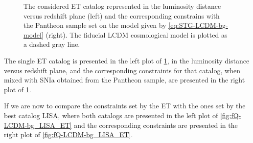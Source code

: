 \begin{figure}[h!]
\begin{subfigure}[t]{0.49\textwidth}
    \end{subfigure}
    \caption[The considered ET catalog represented in the luminosity distance versus redshift plane (left) and the corresponding constrains with the Pantheon sample set on the $f(Q)$ model with $\Lambda$CDM background (right). The fiducial $\Lambda$CDM cosmological model is plotted as a dashed gray line.]
    {The considered \gls{ET} catalog represented in the luminosity distance versus redshift plane (left) and the corresponding constrains with the Pantheon sample set on the model given by \cref{eq:STG-LCDM-bg-model} (right). The fiducial \gls{LCDM} cosmological model is plotted as a dashed gray line.}
    \label{fig:fQ-LCDM-bg_ET}
\end{figure}

The single \gls{ET} catalog is presented in the left plot of \cref{fig:fQ-LCDM-bg_ET}, in the luminosity distance versus redshift plane, and the corresponding constraints for that catalog, when mixed with \gls{SNIa} obtained from the Pantheon sample, are presented in the right plot of \cref{fig:fQ-LCDM-bg_ET}.

If we are now to compare the constraints set by the \gls{ET} with the ones set by the best catalog \gls{LISA}, where both catalogs are presented in the left plot of \cref{fig:fQ-LCDM-bg_LISA_ET} and the corresponding constraints are presented in the right plot of \cref{fig:fQ-LCDM-bg_LISA_ET}.

